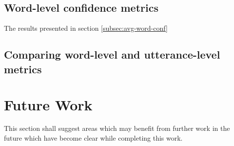 \subsection{Word-level confidence metrics}

The results presented in section \ref{subsec:avg-word-conf}

\subsection{Comparing word-level and utterance-level metrics}

\section{Future Work}

This section shall suggest areas which may benefit from further work in the future which have become clear while completing this work.
